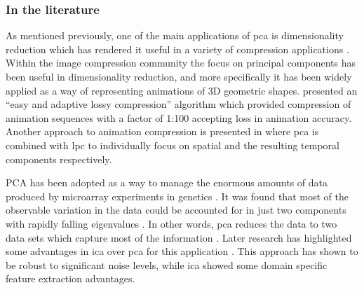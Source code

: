 %
%
%

\subsubsection{In the literature}
As mentioned previously, one of the main applications of \gls{pca} is dimensionality reduction which has rendered it useful in a variety of compression applications \citep{Vasilescu2003}\cite{Alexa2000}\linebreak[2]\cite{Zaeri2006}. Within the image compression community \citep{Vasilescu2003} the focus on principal components has been useful in dimensionality reduction, and more specifically it has been widely applied as a way of representing animations of 3D geometric shapes. \cite{Alexa2000} presented an ``easy and adaptive lossy compression'' algorithm which provided compression of animation sequences with a factor of 1:100 accepting loss in animation accuracy. Another approach to animation compression is presented in \cite{Karni2004} where \gls{pca} is combined with \gls{lpc} to individually focus on spatial and the resulting temporal components respectively.

PCA has been adopted as a way to manage the enormous amounts of data produced by microarray experiments in genetics \cite{Raychaudhuri2000}\cite{Saidi2004}. It was found that most of the observable variation in the data could be accounted for in just two components with rapidly falling eigenvalues \cite{Raychaudhuri2000}. In other words, \gls{pca} reduces the data to two data sets which capture most of the information \cite{Raychaudhuri2000}. Later research has highlighted some advantages in \gls{ica} over \gls{pca} for this application \cite{Saidi2004}. This approach has shown to be robust to significant noise levels, while \gls{ica} showed some domain specific feature extraction advantages.

